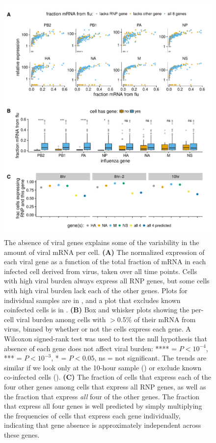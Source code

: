 \documentclass[9pt,lineno]{elife}
\begin{document}
\begin{figure}[t!]
\centerline{\includegraphics[width=0.83\linewidth]{figures/p_flu_burden_flu_gene_merge.pdf}}
\caption{\label{fig:fluburdenbyflugene}
The absence of viral genes explains some of the variability in the amount of viral mRNA per cell.
{\bf (A)} 
The normalized expression of each viral gene as a function of the total fraction of mRNA in each infected cell derived from virus, taken over all time points.
Cells with high viral burden always express all RNP genes, but some cells with high viral burden lack each of the other genes.
Plots for individual samples are in , and a plot that excludes known coinfected cells is in .
{\bf (B)}
Box and whisker plots showing the per-cell viral burden among cells with $>$0.5\% of their mRNA from virus, binned by whether or not the cells express each gene.
A Wilcoxon signed-rank test was used to test the null hypothesis that absence of each gene does not affect viral burden: **** = $P < 10^{-4}$, *** = $P < 10^{-3}$,  * = $P < 0.05$, ns = not significant.
The trends are similar if we look only at the 10-hour sample () or exclude known co-infected cells ().
{\bf (C)}
The fraction of cells that express each of the four other genes among cells that express all RNP genes, as well as the fraction that express \emph{all} four of the other genes.
The fraction that express all four genes is well predicted by simply multiplying the frequencies of cells that express each gene individually, indicating that gene absence is approximately independent across these genes.
}


\end{figure}
\end{document}
